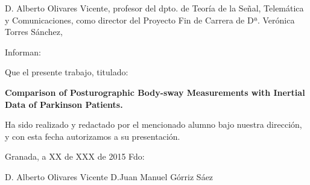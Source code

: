 
\begin{titlepage}
\label{ch:Statement}
\vspace{2cm}

\noindent  D. Alberto Olivares Vicente, profesor  del dpto. de Teoría de la Señal, Telemática y Comunicaciones, como director del Proyecto Fin de Carrera de Dª. Verónica Torres Sánchez,

\vspace{2cm}
\noindent Informan:

\vspace{1.5cm}
\noindent Que el presente trabajo, titulado:

\noindent \textbf{Comparison of Posturographic Body-sway Measurements with Inertial Data of Parkinson Patients.}

\noindent Ha sido realizado y redactado por el mencionado alumno bajo nuestra dirección, y con esta fecha autorizamos a su presentación.
\vspace{3.5cm}

\noindent Granada, a XX de XXX de 2015 Fdo:

\vspace{6.5cm}
\noindent D. Alberto Olivares Vicente    \hfill   D.Juan Manuel Górriz Sáez

\end{titlepage} 